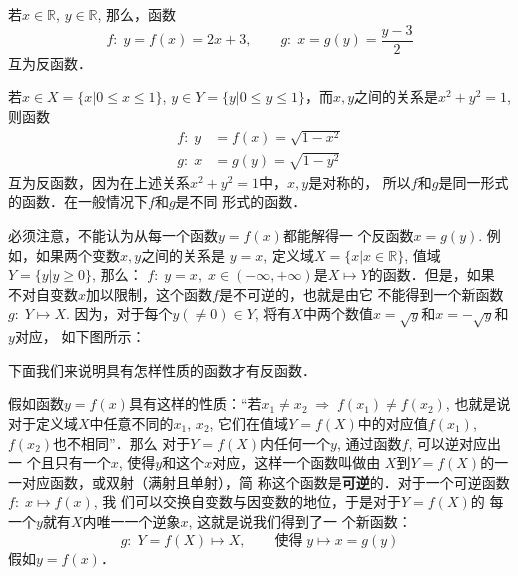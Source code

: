 \begin{example}
    若$x\in\mathbb{R}$, $y\in\mathbb{R}$, 那么，函数
\[f:\; y=f(x)=2x+3,\qquad g:\; x=g(y)=\frac{y-3}{2}\]
互为反函数．
\end{example}


\begin{example}
 若$x\in X=\{x|0\le x\le 1\}$, $y\in Y=\{y|0\le y\le 1\}$，而$x,y$之间的关系是$x^2+y^2=1$, 则函数
\[\begin{split}
  f:\; y&=f(x)=\sqrt{1-x^2}\\
g:\; x&=g(y)=\sqrt{1-y^2}   
\end{split}\]
互为反函数，因为在上述关系$x^2+y^2=1$中，$x,y$是对称的，
所以$f$和$g$是同一形式的函数．在一般情况下$f$和$g$是不同
形式的函数．
\end{example}

必须注意，不能认为从每一个函数$y=f(x)$都能解得一
个反函数$x=g(y)$. 例如，如果两个变数$x,y$之间的关系是
$y=x$, 定义域$X=\{x|x\in\mathbb{R}\}$, 值域$Y=\{y|y\ge 0\}$, 那么：
$f:\; y=x,\; x\in (-\infty,+\infty)$是$X\mapsto Y$的函数．但是，如果
不对自变数$x$加以限制，这个函数$f$是不可逆的，也就是由它
不能得到一个新函数$g:\; Y\mapsto X$. 因为，对于每个$y(\ne 0)\in Y$, 
将有$X$中两个数值$x=\sqrt{y}$和$x=-\sqrt{y}$和$y$对应，
如下图所示：

\begin{figure}[htp]
    \centering
    \caption{}
\end{figure}


下面我们来说明具有怎样性质的函数才有反函数．

假如函数$y=f(x)$具有这样的性质：“若$x_1\ne x_2\; \Rightarrow\; f(x_1)\ne f(x_2)$, 也就是说对于定义域$X$中任意不同的$x_1$, $x_2$, 它们在值域$Y=f(X)$中的对应值$f(x_1)$, $f(x_2)$也不相同”．那么
对于$Y=f(X)$内任何一个$y$, 通过函数$f$, 可以逆对应出一
个且只有一个$x$, 使得$y$和这个$x$对应，这样一个函数叫做由
$X$到$Y=f(X)$的一一对应函数，或双射（满射且单射），简
称这个函数是\textbf{可逆}的．对于一个可逆函数$f:\; x\mapsto f(x)$, 我
们可以交换自变数与因变数的地位，于是对于$Y=f(X)$的
每一个$y$就有$X$内唯一一个逆象$x$, 这就是说我们得到了一
个新函数：
\[ g:\; Y=f(X)\mapsto X,\qquad \text{使得}\; y\mapsto x=g(y)\]
假如$y=f(x)$．

